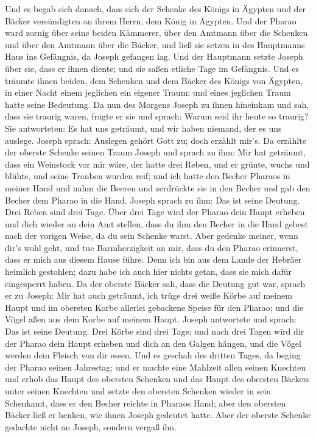  Und es begab sich danach, dass sich der Schenke des
Königs in Ägypten und der Bäcker versündigten an ihrem Herrn, dem König
in Ägypten.  Und der Pharao ward zornig über seine beiden
Kämmerer, über den Amtmann über die Schenken und über den Amtmann über
die Bäcker,  und ließ sie setzen in des Hauptmanns Haus
ins Gefängnis, da Joseph gefangen lag.  Und der Hauptmann
setzte Joseph über sie, dass er ihnen diente; und sie saßen etliche Tage
im Gefängnis.  Und es träumte ihnen beiden, dem Schenken
und dem Bäcker des Königs von Ägypten, in einer Nacht einem jeglichen
ein eigener Traum; und eines jeglichen Traum hatte seine Bedeutung.
 Da nun des Morgens Joseph zu ihnen hineinkam und sah,
dass sie traurig waren,  fragte er sie und sprach: Warum
seid ihr heute so traurig?  Sie antworteten: Es hat uns
geträumt, und wir haben niemand, der es uns auslege. Joseph sprach:
Auslegen gehört Gott zu; doch erzählt mir's.  Da erzählte
der oberste Schenke seinen Traum Joseph und sprach zu ihm: Mir hat
geträumt, dass ein Weinstock vor mir wäre,  der hatte
drei Reben, und er grünte, wuchs und blühte, und seine Trauben wurden
reif;  und ich hatte den Becher Pharaos in meiner Hand
und nahm die Beeren und zerdrückte sie in den Becher und gab den Becher
dem Pharao in die Hand.  Joseph sprach zu ihm: Das ist
seine Deutung. Drei Reben sind drei Tage.  Über drei Tage
wird der Pharao dein Haupt erheben und dich wieder an dein Amt stellen,
dass du ihm den Becher in die Hand gebest nach der vorigen Weise, da du
sein Schenke warst.  Aber gedenke meiner, wenn dir's wohl
geht, und tue Barmherzigkeit an mir, dass du den Pharao erinnerst, dass
er mich aus diesem Hause führe.  Denn ich bin aus dem
Lande der Hebräer heimlich gestohlen; dazu habe ich auch hier nichts
getan, dass sie mich dafür eingesperrt haben.  Da der
oberste Bäcker sah, dass die Deutung gut war, sprach er zu Joseph: Mir
hat auch geträumt, ich trüge drei weiße Körbe auf meinem Haupt
 und im obersten Korbe allerlei gebackene Speise für den
Pharao; und die Vögel aßen aus dem Korbe auf meinem Haupt.
 Joseph antwortete und sprach: Das ist seine Deutung.
Drei Körbe sind drei Tage;  und nach drei Tagen wird dir
der Pharao dein Haupt erheben und dich an den Galgen hängen, und die
Vögel werden dein Fleisch von dir essen.  Und es geschah
des dritten Tages, da beging der Pharao seinen Jahrestag; und er machte
eine Mahlzeit allen seinen Knechten und erhob das Haupt des obersten
Schenken und das Haupt des obersten Bäckers unter seinen Knechten
 und setzte den obersten Schenken wieder in sein
Schenkamt, dass er den Becher reichte in Pharaos Hand; 
aber den obersten Bäcker ließ er henken, wie ihnen Joseph gedeutet
hatte.  Aber der oberste Schenke gedachte nicht an
Joseph, sondern vergaß ihn.

